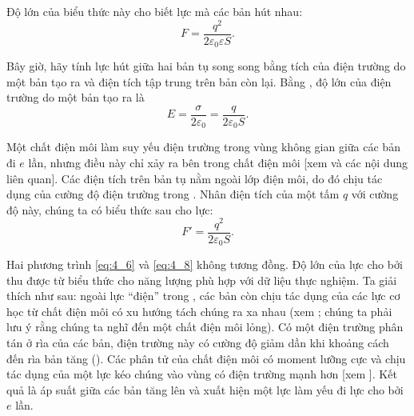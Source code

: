 \noindent
Độ lớn của biểu thức này cho biết lực mà các bản hút nhau:
\begin{equation}\label{eq:4_6}
	F = \frac{q^2}{2 \varepsilon_0 \varepsilon S}.
\end{equation}

Bây giờ, hãy tính lực hút giữa hai bản tụ song song bằng tích của điện trường do một bản tạo ra và điện tích tập trung trên bản còn lại. Bằng , độ lớn của điện trường do một bản tạo ra là 
\begin{equation}\label{eq:4_7}
	E = \frac{\sigma}{2 \varepsilon_0} = \frac{q}{2 \varepsilon_0 S}.
\end{equation}

\noindent
Một chất điện môi làm suy yếu điện trường trong vùng không gian giữa các bản đi $e$ lần, nhưng điều này chỉ xảy ra bên trong chất điện môi [xem  và các nội dung liên quan]. Các điện tích trên bản tụ nằm ngoài lớp điện môi, do đó chịu tác dụng của cường độ điện trường trong . Nhân điện tích của một tấm $q$ với cường độ này, chúng ta có biểu thức sau cho lực:
\begin{equation}\label{eq:4_8}
	F' = \frac{q^2}{2 \varepsilon_0 S}.
\end{equation}

Hai phương trình \eqref{eq:4_6} và \eqref{eq:4_8} không tương đồng.  Độ lớn của lực cho bởi  thu được từ biểu thức cho năng lượng phù hợp với dữ liệu thực nghiệm. Ta giải thích như sau: ngoài lực ``điện'' trong , các bản còn chịu tác dụng của các lực cơ học từ chất điện môi có xu hướng tách chúng ra xa nhau (xem ; chúng ta phải lưu ý rằng chúng ta nghĩ đến một chất điện môi lỏng). Có một điện trường phân tán ở rìa của các bản, điện trường này có cường độ giảm dần khi khoảng cách đến rìa bản tăng (). Các phân tử của chất điện môi có moment lưỡng cực và chịu tác dụng của một lực kéo chúng vào vùng có điện trường mạnh hơn [xem ]. Kết quả là áp suất giữa các bản tăng lên và xuất hiện một lực làm yếu đi lực cho bởi  $e$ lần.

